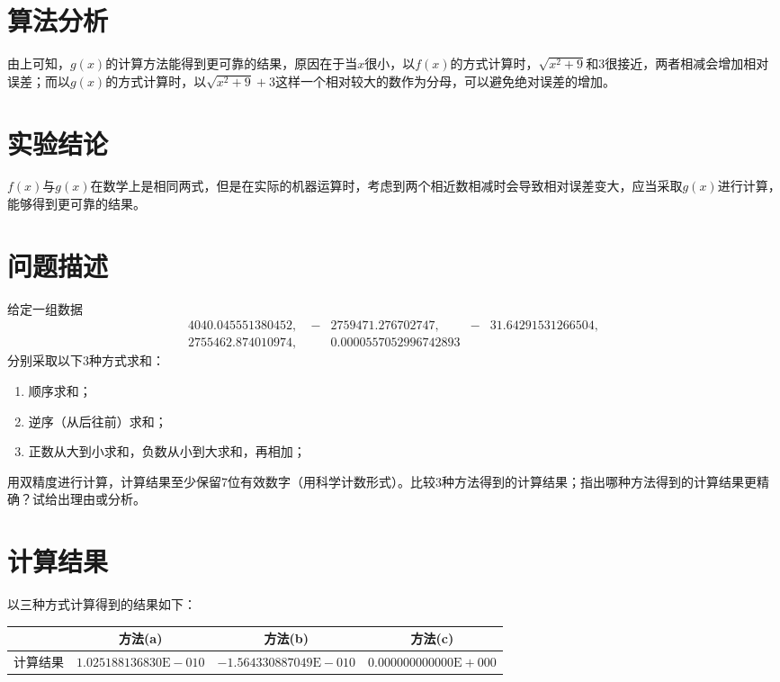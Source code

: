 \documentclass[11pt]{article}
\begin{document}
\section{算法分析}
由上可知，$g(x)$的计算方法能得到更可靠的结果，原因在于当$x$很小，以$f(x)$的方式计算时，$\sqrt{x^2 + 9}$和$3$很接近，两者相减会增加相对误差；而以$g(x)$的方式计算时，以$\sqrt{x^2 + 9} + 3$这样一个相对较大的数作为分母，可以避免绝对误差的增加。

\section{实验结论}
$f(x)$与$g(x)$在数学上是相同两式，但是在实际的机器运算时，考虑到两个相近数相减时会导致相对误差变大，应当采取$g(x)$进行计算，能够得到更可靠的结果。

\section{问题描述}
给定一组数据
\begin{align*}
     & 4040.045551380452,\   & - & 2759471. 276702747,\  & - & 31. 64291531266504, & \\
     & 2755462.874010974 ,\  &   & 0.0000557052996742893 &   &                     &
\end{align*}
分别采取以下3种方式求和：
\begin{enumerate}[label = (\alph*)]
    \item 顺序求和；
    \item 逆序（从后往前）求和；
    \item 正数从大到小求和，负数从小到大求和，再相加；
\end{enumerate}

用双精度进行计算，计算结果至少保留7位有效数字（用科学计数形式）。比较3种方法得到的计算结果；指出哪种方法得到的计算结果更精确？试给出理由或分析。

\section{计算结果}
以三种方式计算得到的结果如下：
\begin{table}[h]
    \centering
    \begin{tabular}{|c|c|c|c|}
        \hline
                 & 方法(a)                        & 方法(b)                         & 方法(c)                        \\ \hline
        计算结果 & $1.025188136830\text{E}{-}010$ & $-1.564330887049\text{E}{-}010$ & $0.000000000000\text{E}{+}000$ \\ \hline
    \end{tabular}
\end{table}
\end{document}
